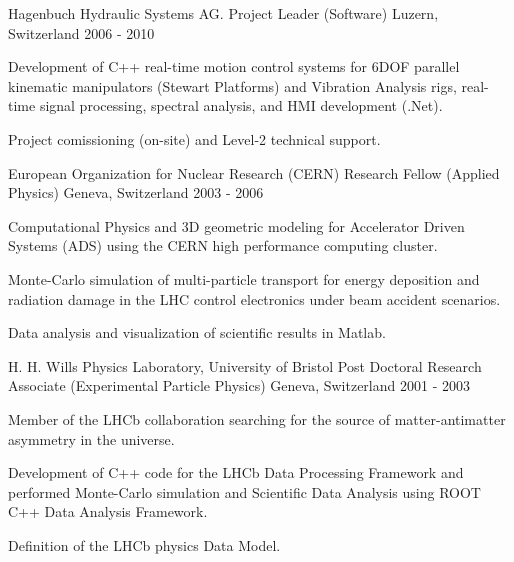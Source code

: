 \begin{cventries}
\cventry
{Hagenbuch Hydraulic Systems AG.} %
{Project Leader (Software)} %
{Luzern, Switzerland} %
{2006 - 2010} %
{
  \begin{cvitems} %
    \item {
        Development of C++ real-time motion control systems for 6DOF parallel 
        kinematic manipulators (Stewart Platforms) and Vibration Analysis rigs,
        real-time signal processing, spectral analysis, and HMI development (.Net).}
    \item {
        Project comissioning (on-site) and Level-2 technical support.}
  \end{cvitems}
}

\cventry
{European Organization for Nuclear Research (CERN)} %
{Research Fellow (Applied Physics)} %
{Geneva, Switzerland} %
{2003 - 2006} %
{
  \begin{cvitems} %
    \item {
        Computational Physics and 3D geometric modeling for Accelerator Driven Systems (ADS) using the CERN 
        high performance computing cluster.}
    \item {
        Monte-Carlo simulation of multi-particle transport for energy deposition 
        and radiation damage in the LHC control electronics under 
        beam accident scenarios.} 
        \item{
        Data analysis and visualization of scientific results in Matlab.}
  \end{cvitems}
}

\cventry
{H. H. Wills Physics Laboratory, University of Bristol} %
{Post Doctoral Research Associate (Experimental Particle Physics)} %
{Geneva, Switzerland} %
{2001 - 2003} %
{
  \begin{cvitems} %
    \item {
        Member of the LHCb collaboration searching for the source of matter-antimatter 
        asymmetry in the universe.}
    \item {
          Development of C++ code for the LHCb Data Processing Framework and 
          performed Monte-Carlo simulation
          and Scientific Data Analysis using ROOT C++ Data Analysis Framework.}
    \item {
        Definition of the LHCb physics Data Model.}
  \end{cvitems}
}


\end{cventries}
